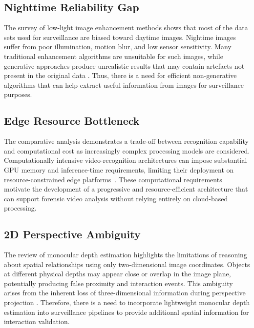 \documentclass[conference]{IEEEtran}
\begin{document}
\subsection{Nighttime Reliability Gap}

The survey of low-light image enhancement methods shows that most of the data sets used for surveillance are biased toward daytime images. Nightime images suffer from poor illumination, motion blur, and low sensor sensitivity. Many traditional enhancement algorithms are unsuitable for such images, while generative approaches produce unrealistic results that may contain artefacts not present in the original data \cite{lime,enlightengan,zerodce,retinexnet}. Thus, there is a need for efficient non-generative algorithms that can help extract useful information from images for surveillance purposes.

\subsection{Edge Resource Bottleneck}

The comparative analysis demonstrates a trade-off between recognition
capability and computational cost as increasingly complex processing
models are considered. Computationally intensive video-recognition
architectures can impose substantial GPU memory and inference-time
requirements, limiting their deployment on resource-constrained edge
platforms~\cite{liu2022video,feichtenhofer2019slowfast}. These
computational requirements motivate the development of a progressive
and resource-efficient architecture that can support forensic video
analysis without relying entirely on cloud-based processing.

\subsection{2D Perspective Ambiguity}

The review of monocular depth estimation highlights the limitations of
reasoning about spatial relationships using only two-dimensional image
coordinates. Objects at different physical depths may appear close or
overlap in the image plane, potentially producing false proximity and
interaction events. This ambiguity arises from the inherent loss of
three-dimensional information during perspective projection
\cite{monovit,liuhe2024depthanything,yang2024depth}. Therefore, there
is a need to incorporate lightweight monocular depth estimation into
surveillance pipelines to provide additional spatial information for
interaction validation.
\end{document}
